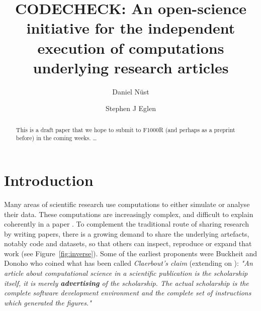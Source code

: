 \documentclass[12pt]{article}
\begin{document}
\title{CODECHECK: An open-science initiative for the independent execution of computations underlying research articles}
\author[1,$\ast$]{Daniel N\"{u}st}
\author[2,$\ast$]{Stephen J Eglen}
\maketitle
\begin{abstract}
  This is a draft paper that we hope to submit to F1000R (and perhaps
  as a preprint before) in the coming weeks.
  \ldots{}
\end{abstract}

\section*{Introduction}\label{introduction}

Many areas of scientific research use computations to either simulate
or analyse their data. These computations are increasingly complex, and
difficult to explain coherently in a paper \citep{marwick_how_2015}.
To complement the traditional route of sharing research by writing papers,
there is a growing demand to share the underlying artefacts, notably 
code and datasets, so that others can inspect, reproduce or expand that work
(see Figure~\ref{fig:inverse}).
Some of the earliest proponents were Buckheit and Donoho
\cite{buckheit_wavelab_1995} who coined what has been called 
\emph{Claerbout's claim} (extending on \citet{claerbout_electronic_1992}):
\emph{"An article about computational science in a scientific publication 
is  the scholarship itself, it is merely \textbf{advertising} of
the scholarship. The actual scholarship is the complete software development
environment and the complete set of instructions which generated the 
figures."}
\end{document}
